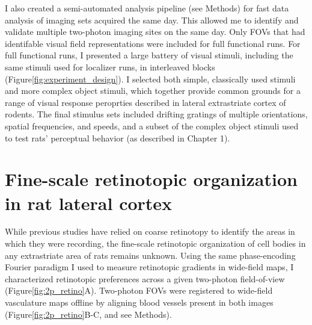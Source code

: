 I also created a semi-automated analysis pipeline (see Methods) for fast data analysis of imaging sets acquired the same day. This allowed me to identify and validate multiple two-photon imaging sites on the same day. Only FOVs that had identifable visual field representations were included for full functional runs. For full functional runs, I presented a large battery of visual stimuli, including the same stimuli used for localizer runs, in interleaved blocks (Figure\ref{fig:experiment_design}). I selected both simple, classically used stimuli and more complex object stimuli, which together provide common grounds for a range of visual response peroprties described in lateral extrastriate cortex of rodents. The final stimulus sets included drifting gratings of multiple orientations, spatial frequencies, and speeds, and a subset of the complex object stimuli used to test rats' perceptual behavior (as described in Chapter 1).


\section{Fine-scale retinotopic organization in rat lateral cortex}
While previous studies have relied on coarse retinotopy to identify the areas in which they were recording, the fine-scale retinotopic organization of cell bodies in any extrastriate area of rats remains unknown. Using the same phase-encoding Fourier paradigm I used to measure retinotopic gradients in wide-field maps, I characterized retinotopic preferences across a given two-photon field-of-view (Figure\ref{fig:2p_retino}A). Two-photon FOVs were registered to wide-field vasculature maps offline by aligning blood vessels present in both images (Figure\ref{fig:2p_retino}B-C, and see Methods). 

